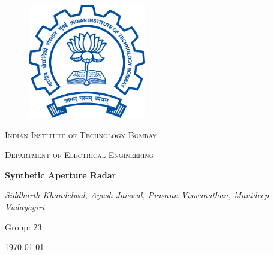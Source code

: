\documentclass[twoside,10pt,a4paper]{article}
\numberwithin{equation}{section}					%
\numberwithin{figure}{section}						%
\begin{document}
\selectfont
\begin{titlepage}
	\centering
	\begin{figure}[h]
	\centering
	\includegraphics[height=5cm]{IITB-logo.png}	
	\label{fig:example}
\end{figure}
	{\scshape\LARGE Indian Institute of Technology Bombay\par}
	
	{\scshape \LARGE Department of Electrical Engineering\par}
	\vspace{1cm}
	{\huge\bfseries Synthetic Aperture Radar\par}
	\vspace{1cm}
	{\Large\itshape Siddharth Khandelwal, Ayush Jaiswal, Prasann Viswanathan, Manideep Vudayagiri\par}		%
	\vspace{1cm}
	{\large Group: 23}\\		%
	\vspace{1cm}
	{\large \today\par}
\end{titlepage}
\newpage
\begin{abstract}        
    Synthetic Aperture Radar (SAR) are a important type of aerial or space-bourne radar for surveillance and terrain mapping. It is a form of radar used to create two-dimensional images. We discuss the basic principle of SAR and its working. We give an overview of a SAR system and detail its components. We complete a discussion of various techniques utilized in SAR data. Finally we list a number of applications of SAR where they are useful.
\end{abstract}
\end{document}
